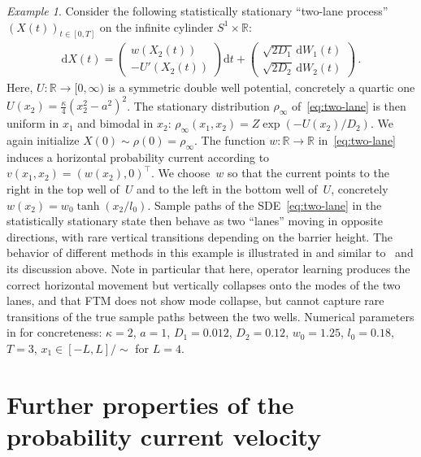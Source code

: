 \documentclass[oneside,11pt]{article}
\theoremstyle{remark}
\newtheorem{example}{Example}
\begin{document}
\begin{example}
\label{example:two-lane}
Consider the following statistically stationary ``two-lane process'' $(X(t))_{t \in [0,T]}$ on the infinite cylinder $S^1 \times \mathbb{R}$:
\begin{align} \label{eq:two-lane}
\mathrm{d} X(t) =
    \begin{pmatrix}
        w(X_2(t)) \\ -U'(X_2(t))
    \end{pmatrix} \mathrm{d}t + \begin{pmatrix}
        \sqrt{2 D_1} \, \mathrm{d}W_1(t) \\ \sqrt{2 D_2} \, \mathrm{d}W_2(t)
    \end{pmatrix}\,.
\end{align}
Here, $U \colon \mathbb{R} \to [0,\infty)$ is a symmetric double well potential, concretely a quartic one $U(x_2) = \tfrac{\kappa}{4} (x_2^2 - a^2)^2$. The stationary distribution $\rho_\infty$ of~\eqref{eq:two-lane} is then uniform in $x_1$ and bimodal in $x_2$: $\rho_\infty(x_1,x_2) = Z \exp (-U(x_2)/D_2)$. We again initialize $X(0) \sim \rho(0) = \rho_\infty$. The function $w \colon \mathbb{R} \to \mathbb{R}$ in~\eqref{eq:two-lane} induces a horizontal probability current according to $v(x_1,x_2) = (w(x_2),0)^\top$. We choose~$w$ so that the current points to the right in the top well of~$U$ and to the left in the bottom well of~$U$, concretely $w(x_2) = w_0 \tanh(x_2 / l_0)$. Sample paths of the SDE~\eqref{eq:two-lane} in the statistically stationary state then behave as two ``lanes'' moving in opposite directions, with rare vertical transitions depending on the barrier height. The behavior of different methods in this example is illustrated in  and similar to~ and its discussion above. Note in particular that here, operator learning produces the correct horizontal movement but vertically collapses onto the modes of the two lanes, and that FTM does not show mode collapse, but cannot capture rare transitions of the true sample paths between the two wells. Numerical parameters in  for concreteness: $\kappa = 2$, $a = 1$, $D_1 = 0.012$, $D_2 = 0.12$, $w_0 = 1.25$, $l_0 = 0.18$, $T = 3$, $x_1 \in [-L,L]/\sim$ for $L = 4$.
\end{example}

\section{Further properties of the probability current velocity}\label{appendix:prob-current}
\end{document}

